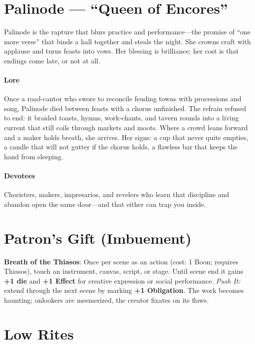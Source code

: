 \section{Palinode --- ``Queen of Encores''}
\label{chap:palinode}

\begin{tcolorbox}[colback=black!3,colframe=black!40!white,title={Theme \& Atmosphere}]
Palinode is the rapture that blurs practice and performance---the promise of ``one more verse'' that binds a hall together and steals the night. She crowns craft with applause and turns feasts into vows. Her blessing is brilliance; her cost is that endings come late, or not at all.
\end{tcolorbox}

\paragraph*{Lore}
Once a road-cantor who swore to reconcile feuding towns with processions and song, Palinode died between feasts with a chorus unfinished. The refrain refused to end: it braided toasts, hymns, work-chants, and tavern rounds into a living current that still coils through markets and moots. Where a crowd leans forward and a maker holds breath, she arrives. Her signs: a cup that never quite empties, a candle that will not gutter if the chorus holds, a flawless bar that keeps the hand from sleeping.

\paragraph*{Devotees}
Choristers, makers, impresarios, and revelers who learn that discipline and abandon open the same door---and that either can trap you inside.

\section*{Patron's Gift (Imbuement)}
\label{sec:palinode-gift}
\textbf{Breath of the Thiasos}: Once per scene as an action (cost: 1 Boon; requires Thiasos), touch an instrument, canvas, script, or stage. Until scene end it gains \textbf{+1 die} and \textbf{+1 Effect} for creative expression or social performance. \emph{Push It:} extend through the next scene by marking \textbf{+1 Obligation}. The work becomes haunting; onlookers are mesmerized, the creator fixates on its flaws.

\section*{Low Rites}
\label{sec:palinode-low}

